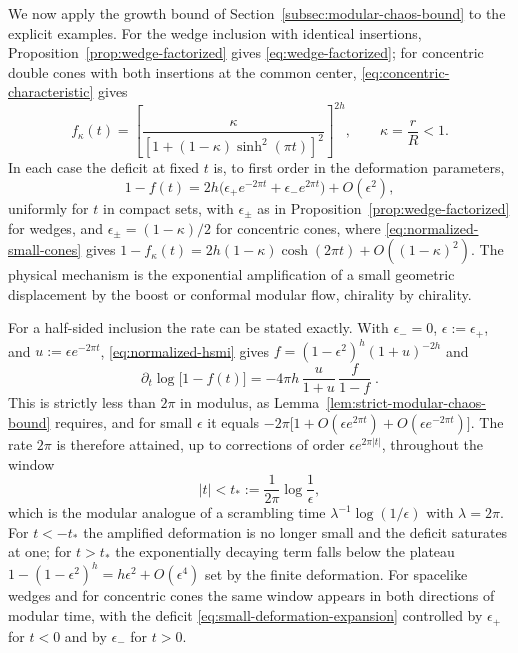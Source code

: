 \documentclass[a4paper,11pt]{article}
\theoremstyle{definition}
\begin{document}
We now apply the growth bound of Section~\ref{subsec:modular-chaos-bound} to the explicit examples. For the wedge inclusion with identical insertions, Proposition~\ref{prop:wedge-factorized} gives \eqref{eq:wedge-factorized}; for concentric double cones with both insertions at the common center, \eqref{eq:concentric-characteristic} gives
\begin{equation}
 f_\kappa(t)=\left[\frac{\kappa}{[1+(1-\kappa)\sinh^2(\pi t)]^2}\right]^{2h},\qquad\kappa=\frac rR<1 .
 \label{eq:normalized-small-cones}
\end{equation}
In each case the deficit at fixed $t$ is, to first order in the deformation parameters,
\begin{equation}
 1-f(t)=2h\bigl(\epsilon_+e^{-2\pi t}+\epsilon_-e^{2\pi t}\bigr)+O(\epsilon^2),
 \label{eq:small-deformation-expansion}
\end{equation}
uniformly for $t$ in compact sets, with $\epsilon_\pm$ as in Proposition~\ref{prop:wedge-factorized} for wedges, and $\epsilon_\pm=(1-\kappa)/2$ for concentric cones, where \eqref{eq:normalized-small-cones} gives $1-f_\kappa(t)=2h(1-\kappa)\cosh(2\pi t)+O((1-\kappa)^2)$. The physical mechanism is the exponential amplification of a small geometric displacement by the boost or conformal modular flow, chirality by chirality.

For a half-sided inclusion the rate can be stated exactly. With $\epsilon_-=0$, $\epsilon:=\epsilon_+$, and $u:=\epsilon e^{-2\pi t}$, \eqref{eq:normalized-hsmi} gives $f=(1-\epsilon^2)^h(1+u)^{-2h}$ and
\begin{equation}
 \partial_t\log\bigl[1-f(t)\bigr]=-4\pi h\,\frac{u}{1+u}\,\frac{f}{1-f}\;.
 \label{eq:exact-rate}
\end{equation}
This is strictly less than $2\pi$ in modulus, as Lemma~\ref{lem:strict-modular-chaos-bound} requires, and for small $\epsilon$ it equals $-2\pi\bigl[1+O(\epsilon e^{2\pi t})+O(\epsilon e^{-2\pi t})\bigr]$. The rate $2\pi$ is therefore attained, up to corrections of order $\epsilon e^{2\pi|t|}$, throughout the window
\begin{equation}
 |t|<t_*:=\frac1{2\pi}\log\frac1\epsilon ,
 \label{eq:scrambling-window}
\end{equation}
which is the modular analogue of a scrambling time $\lambda^{-1}\log(1/\epsilon)$ with $\lambda=2\pi$. For $t<-t_*$ the amplified deformation is no longer small and the deficit saturates at one; for $t>t_*$ the exponentially decaying term falls below the plateau $1-(1-\epsilon^2)^h=h\epsilon^2+O(\epsilon^4)$ set by the finite deformation. For spacelike wedges and for concentric cones the same window appears in both directions of modular time, with the deficit \eqref{eq:small-deformation-expansion} controlled by $\epsilon_+$ for $t<0$ and by $\epsilon_-$ for $t>0$.
\end{document}
